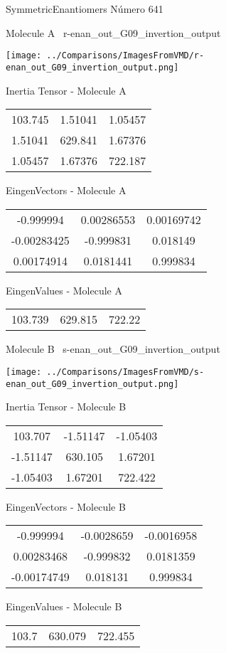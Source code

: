 \vtab[-3cm]
\begin{center}
{\large SymmetricEnantiomers \tab Número 641}
\end{center}
\begin{multicols}{2}
\begin{center}

Molecule A \
r-enan\_out\_G09\_invertion\_output

\texttt{[image: ../Comparisons/ImagesFromVMD/r-enan\_out\_G09\_invertion\_output.png]}

Inertia Tensor - Molecule A \\
\begin{tabular}{|c c c|}
103.745	 & 	1.51041	 & 	1.05457	 \\
1.51041	 & 	629.841	 & 	1.67376	 \\
1.05457	 & 	1.67376	 & 	722.187
\end{tabular}

\vtab
 EingenVectors - Molecule A     \\
\begin{tabular}{|c c c|}
-0.999994	 & 	0.00286553	 & 	0.00169742	 \\
-0.00283425	 & 	-0.999831	 & 	0.018149	 \\
0.00174914	 & 	0.0181441	 & 	0.999834
\end{tabular}

\vtab
 EingenValues - Molecule A     \\
\begin{tabular}{|c c c|}
103.739	 & 	629.815	 & 	722.22	 \\
\end{tabular}
\columnbreak

Molecule B \
s-enan\_out\_G09\_invertion\_output

\texttt{[image: ../Comparisons/ImagesFromVMD/s-enan\_out\_G09\_invertion\_output.png]}

Inertia Tensor - Molecule B \\
\begin{tabular}{|c c c|}
103.707	 & 	-1.51147	 & 	-1.05403	 \\
-1.51147	 & 	630.105	 & 	1.67201	 \\
-1.05403	 & 	1.67201	 & 	722.422
\end{tabular}

\vtab
 EingenVectors - Molecule B     \\
\begin{tabular}{|c c c|}
-0.999994	 & 	-0.0028659	 & 	-0.0016958	 \\
0.00283468	 & 	-0.999832	 & 	0.0181359	 \\
-0.00174749	 & 	0.018131	 & 	0.999834
\end{tabular}

\vtab
 EingenValues - Molecule B     \\
\begin{tabular}{|c c c|}
103.7	 & 	630.079	 & 	722.455	 \\
\end{tabular}

\end{center}
\end{multicols}

